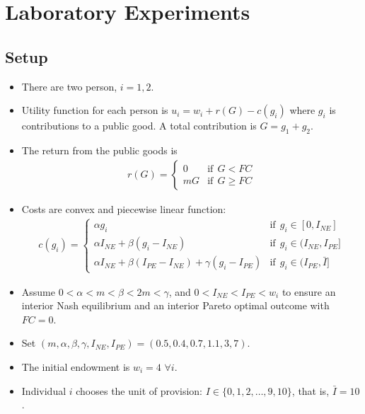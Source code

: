 \documentclass[../root]{subfiles}
\begin{document}
    \section{Laboratory Experiments}
    
    \subsection{Setup}

    \begin{itemize}
        \item There are two person, $i = 1, 2$.
        \item Utility function for each person is $u_i = w_i + r(G) - c(g_i)$
        where $g_i$ is contributions to a public good. A total contribution is $G = g_1 + g_2$.
        \item The return from the public goods is 
        \begin{align*}
            r(G) =
            \begin{cases}
                0   &\text{if}\:\: G < FC \\
                mG  &\text{if}\:\: G \ge FC
            \end{cases}
        \end{align*}
        \item Costs are convex and piecewise linear function:
        \begin{align*}
            c(g_i) =
            \begin{cases}
                \alpha g_i 
                &\text{if}\:\: g_i \in [0, I_{NE}]  \\
                \alpha I_{NE} + \beta (g_i - I_{NE}) 
                &\text{if}\:\: g_i \in (I_{NE}, I_{PE}]  \\
                \alpha I_{NE} + \beta (I_{PE} - I_{NE}) + \gamma (g_i - I_{PE})  
                &\text{if}\:\: g_i \in (I_{PE}, \bar{I}]
            \end{cases}
        \end{align*}
        \item Assume $0 < \alpha < m < \beta < 2m < \gamma$, and $0 < I_{NE} < I_{PE} < w_i$
        to ensure an interior Nash equilibrium and an interior Pareto optimal outcome with $FC = 0$.
        \item Set $(m, \alpha, \beta, \gamma, I_{NE}, I_{PE}) = (0.5,0.4,0.7,1.1,3,7)$.
        \item The initial endowment is $w_i = 4$ $\forall i$.
        \item Individual $i$ chooses the unit of provision: $I \in \{0, 1, 2, \ldots, 9, 10\}$, that is, $\bar{I} = 10$.

\end{itemize}
\end{document}
